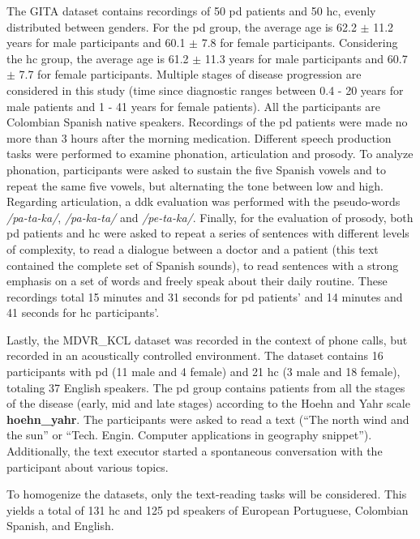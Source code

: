 The GITA dataset contains recordings of 50 \gls{pd} patients and 50 \gls{hc}, evenly distributed between genders. For the \gls{pd} group, the average age is 62.2 $\pm$ 11.2 years for male participants and 60.1 $\pm$ 7.8 for female participants. Considering the \gls{hc} group, the average age is 61.2 $\pm$ 11.3 years for male participants and 60.7 $\pm$ 7.7 for female participants. Multiple stages of disease progression are considered in this study (time since diagnostic ranges between 0.4 - 20 years for male patients and 1 - 41 years for female patients). All the participants are Colombian Spanish native speakers. Recordings of the \gls{pd} patients were made no more than 3 hours after the morning medication. Different speech production tasks were performed to examine phonation, articulation and prosody. To analyze phonation, participants were asked to sustain the five Spanish vowels and to repeat the same five vowels, but alternating the tone between low and high. Regarding articulation, a \gls{ddk} evaluation was performed with the pseudo-words \textit{/pa-ta-ka/}, \textit{/pa-ka-ta/} and \textit{/pe-ta-ka/}. Finally, for the evaluation of prosody, both \gls{pd} patients and \gls{hc} were asked to repeat a series of sentences with different levels of complexity, to read a dialogue between a doctor and a patient (this text contained the complete set of Spanish sounds), to read sentences with a strong emphasis on a set of words and freely speak about their daily routine. These recordings total 15 minutes and 31 seconds for \gls{pd} patients' and 14 minutes and 41 seconds for \gls{hc} participants'.

Lastly, the MDVR\_KCL dataset was recorded in the context of phone calls, but recorded in an acoustically controlled environment. The dataset contains 16 participants with \gls{pd} (11 male and 4 female) and 21 \gls{hc} (3 male and 18 female), totaling 37 English speakers. The \gls{pd} group contains patients from all the stages of the disease (early, mid and late stages) according to the  Hoehn and Yahr scale \textbf{hoehn\_yahr}. The participants were asked to read a text (``The north wind and the sun'' or ``Tech. Engin. Computer applications in geography snippet''). Additionally, the text executor started a spontaneous conversation with the participant about various topics.

To homogenize the datasets, only the text-reading tasks will be considered. This yields a total of 131 \gls{hc} and 125 \gls{pd} speakers of European Portuguese, Colombian Spanish, and English. 


